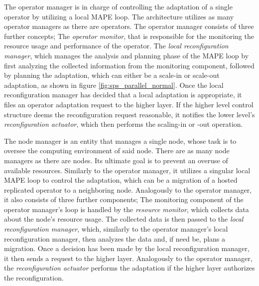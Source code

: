         \quad The operator manager is in charge of controlling the adaptation of a single operator by utilizing a local MAPE loop.
        The architecture utilizes as many operator managers as there are operators.
        The operator manager consists of three further concepts;
        The \textit{operator monitor}, that is responsible for the monitoring the resource usage and performance of the operator.
        The \textit{local reconfiguration manager}, which manages the analysis and planning phase of the MAPE loop by first analyzing the collected information 
        from the monitoring component, followed by planning the adaptation, which can either be a scale-in or scale-out adaptation, 
        as shown in figure \ref{fig:sps_parallel_normal}.
        Once the local reconfiguration manager has decided that a local adaptation is appropriate, it files an operator adaptation request to the higher layer.
        If the higher level control structure deems the reconfiguration request reasonable, it notifies the lower level's \textit{reconfiguration actuator}, which then 
        performs the scaling-in or -out operation.

        \quad The node manager is an entity that manages a single node, whose task is to oversee the computing environment of said node.
        There are as many node managers as there are nodes.
        Its ultimate goal is to prevent an overuse of available resources.
        Similarly to the operator manager, it utilizes a singular local MAPE loop to control the adaptation, 
        which can be a migration of a hosted replicated operator to a neighboring node. 
        Analogously to the operator manager, it also consists of three further components;
        The monitoring component of the operator manager's loop is handled by the \textit{resource monitor}, which collects data about the node's resource usage.
        The collected data is then passed to the \textit{local reconfiguration manager}, which, similarly to the operator manager's local reconfiguration manager, then
        analyzes the data and, if need be, plans a migration. 
        Once a decision has been made by the local reconfiguration manager, it then sends a request to the higher layer. Analogously to the operator manager, the \textit{reconfiguration actuator} performs
        the adaptation if the higher layer authorizes the reconfiguration.

